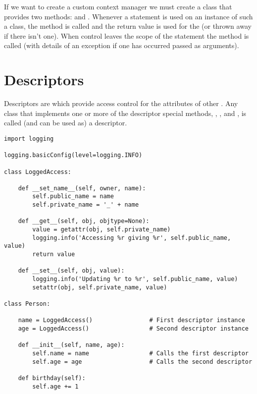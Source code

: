If we want to create a custom context manager we must create a class that provides two methods:  and .
Whenever a  statement is used on an instance of such a class, the  method is called and the return value is used for the  (or thrown away if there isn’t one).
When control leaves the scope of the  statement the  method is called (with details of an exception if one has occurred passed as arguments).


\section{Descriptors}
\label{sec:descriptors}


Descriptors are  which provide access control for the attributes of other .
Any class that implements one or more of the descriptor special methods, , , and , is called (and can be used as) a descriptor.


\begin{lstlisting}
import logging

logging.basicConfig(level=logging.INFO)

class LoggedAccess:

    def __set_name__(self, owner, name):
        self.public_name = name
        self.private_name = '_' + name

    def __get__(self, obj, objtype=None):
        value = getattr(obj, self.private_name)
        logging.info('Accessing %r giving %r', self.public_name, value)
        return value

    def __set__(self, obj, value):
        logging.info('Updating %r to %r', self.public_name, value)
        setattr(obj, self.private_name, value)

class Person:

    name = LoggedAccess()                # First descriptor instance
    age = LoggedAccess()                 # Second descriptor instance

    def __init__(self, name, age):
        self.name = name                 # Calls the first descriptor
        self.age = age                   # Calls the second descriptor

    def birthday(self):
        self.age += 1
\end{lstlisting}

